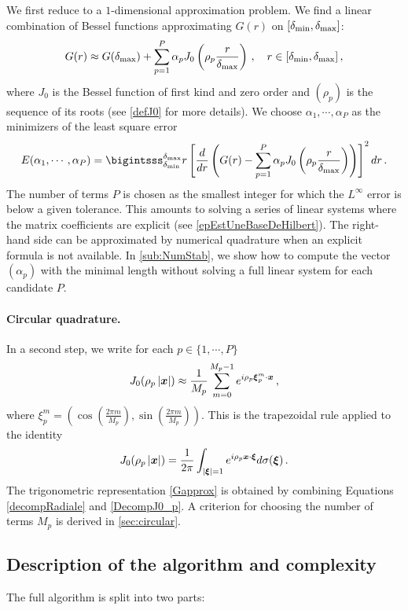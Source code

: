 \documentclass[smallextended]{svjour3}
\begin{document}
We first reduce to a $1$-dimensional approximation problem. We find a linear combination of Bessel functions approximating $G(r)$ on $[\delta_{\min},\delta_{\max}]$:
\begin{equation}
	G(r) \approx G(\delta_{\max}) + \sum_{p=1}^P \alpha_p J_0\left(\rho_p \frac{r}{\delta_{\max}}\right)\,, \quad r \in [\delta_{\min},\delta_{\max}]\,,\label{decompRadiale}
\end{equation}
where $J_0$ is the Bessel function of first kind and zero order and $(\rho_p)$ is the sequence of its roots (see \autoref{defJ0} for more details). We choose $\alpha_1,\cdots, \alpha_{P}$ as the minimizers of the least square error
\[E(\alpha_1,\cdots,\alpha_P) = \bigintsss_{\rmin}^{\rmax}r \left[\frac{d}{dr}\left(G(r) - \sum_{p=1}^P \alpha_p J_0\left(\rho_p \frac {r}{\rmax}\right)\right)\right]^2 dr\,.\]
The number of terms $P$ is chosen as the smallest integer for which the $L^\infty$ error is below a given tolerance. This amounts to solving a series of linear systems where the matrix coefficients are explicit (see \autoref{epEstUneBaseDeHilbert}). The right-hand side can be approximated by numerical quadrature when an explicit formula is not available. In \autoref{sub:NumStab}, we show how to compute the vector $(\alpha_p)$ with the minimal length without solving a full linear system for each candidate $P$.   
\paragraph{Circular quadrature.}In a second step, we write for each $p \in \{ 1,\cdots, P \}$
\begin{equation}
	J_0(\rho_p \left\lvert \boldsymbol{x} \right\rvert) \approx \dfrac{1}{M_p}\sum_{m=0}^{M_p-1}e^{i \rho_p \boldsymbol{\xi}_p^m \cdot \boldsymbol{x}}\,,
	\label{DecompJ0_p}
\end{equation}
where $\xi^m_p = \left(\cos\left(\frac{2\pi m}{M_p}\right),\sin\left(\frac{2\pi m}{M_p}\right)\right)$. This is the trapezoidal rule applied to the identity
\[ J_0(\rho_p\left\lvert \boldsymbol{x} \right\rvert) = \frac{1}{2\pi}\int_{\left\lvert \boldsymbol{\xi} \right\rvert=1}{e^{i \rho_p\boldsymbol{x} \cdot \boldsymbol{\xi}}} d\sigma(\boldsymbol{\xi})\,.\]
The trigonometric representation \eqref{Gapprox} is obtained by combining Equations \eqref{decompRadiale} and \eqref{DecompJ0_p}. A criterion for choosing the number of terms $M_p$ is derived in \autoref{sec:circular}.  


\subsection{Description of the algorithm and complexity}
\label{fullDescr}
The full algorithm is split into two parts:
\end{document}
